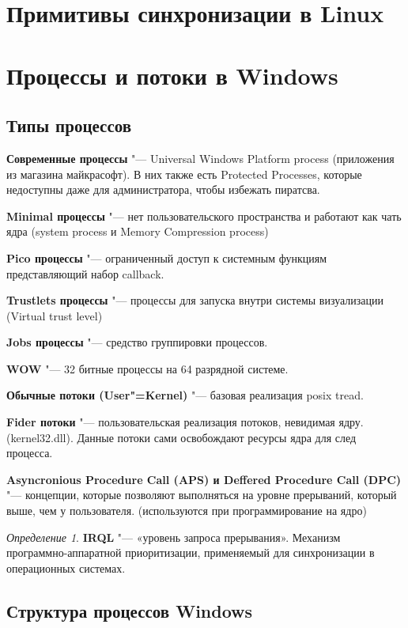 \documentclass[bachelor, och, book]{SCWorks}
\theoremstyle{remark}
\newtheorem{definition}{Определение}
\begin{document}
    \section{Примитивы синхронизации в Linux}


    \section{Процессы и потоки в Windows}

    \subsection{Типы процессов}

    \textbf{Современные процессы} "--- Universal Windows Platform process (приложения из магазина майкрасофт). В них также есть Protected Processes, которые недоступны даже для администратора, чтобы избежать пиратсва.

    \textbf{Minimal процессы} "--- нет пользовательского пространства и работают как чать ядра (system process и Memory Compression process)
    
    \textbf{Pico процессы} "--- ограниченный доступ к системным функциям представляющий набор callback.

    \textbf{Trustlets процессы} "--- процессы для запуска внутри системы визуализации (Virtual trust level)

    \textbf{Jobs процессы} "--- средство группировки процессов.

    \textbf{WOW} "--- 32 битные процессы на 64 разрядной системе.

    \textbf{Обычные потоки (User"=Kernel)} "--- базовая реализация posix tread.

    \textbf{Fider потоки} "--- пользовательская реализация потоков, невидимая ядру. (kernel32.dll). Данные потоки сами освобождают ресурсы ядра для след процесса.

    \textbf{Asyncronious Procedure Call (APS) и Deffered Procedure Call (DPC)} "--- концепции, которые позволяют выполняться на уровне прерываний, который выше, чем у пользователя. (используются при программирование на ядро)

    \begin{definition}
        \textbf{IRQL} "--- «уровень запроса прерывания». Механизм программно-аппаратной приоритизации, применяемый для синхронизации в операционных системах.
    \end{definition}

    \subsection{Структура процессов Windows}
\end{document}
